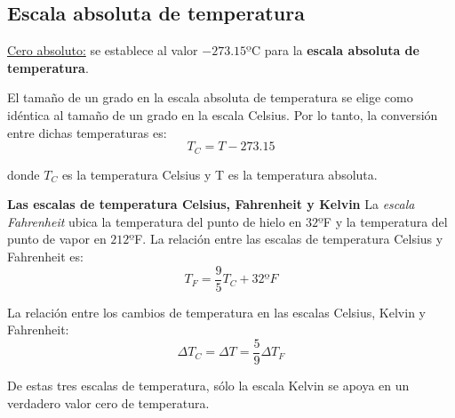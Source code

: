 \subsection{Escala absoluta de temperatura}

  \PN \underline{Cero absoluto:} se establece al valor $-273.15º$C para la \textbf{escala absoluta de temperatura}.

  \vspace{3mm}
  \PN El tamaño de un grado en la escala absoluta de temperatura se elige como idéntica al tamaño de un grado en la
  escala Celsius. Por lo tanto, la conversión entre dichas temperaturas es:
  \begin{equation*}
    T_{C} = T - 273.15
  \end{equation*}

  \PN donde $T_{C}$ es la temperatura Celsius y T es la temperatura absoluta.

  \vspace{3mm}
  \PN \textbf{Las escalas de temperatura Celsius, Fahrenheit y Kelvin}
  \PN La \textit{escala Fahrenheit} ubica la temperatura del punto de hielo en $32º$F y la temperatura del punto de
  vapor en $212º$F. La relación entre las escalas de temperatura Celsius y Fahrenheit es:
  \begin{equation*}
    T_{F} = \frac{9}{5} T_{C} + 32º F
  \end{equation*}

  \PN La relación entre los cambios de temperatura en las escalas Celsius, Kelvin y Fahrenheit:
  \begin{equation*}
    \Delta T_{C} = \Delta T = \frac{5}{9} \Delta T_{F}
  \end{equation*}

  \PN De estas tres escalas de temperatura, sólo la escala Kelvin se apoya en un verdadero valor cero de temperatura.
